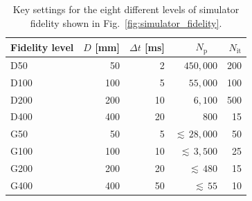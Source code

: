\documentclass[10pt]{article}
\begin{document}
\begin{table}[ht] 
  \caption{Key settings for the eight different levels of simulator fidelity shown in Fig.~\ref{fig:simulator_fidelity}.}
  \centering
  \begin{tabular}{|l|r|r|r|r|}%
  \hline
  Fidelity level & $D$ [mm]  &  $\Delta t$ [ms]  & $N_\mathrm{p} \quad$ & $N_\mathrm{it}$\\ 
  \hline
  D50           & 50              &  2              &  $450,000$     &  200 \\
  D100          & 100             &  5              &  $55,000$     &  100 \\
  D200          & 200             &  10             &  $6,100$     &  500 \\
  D400          & 400             &  20             &  $800$     &  15 \\
  \hline
  G50           & 50              &  5              &  ${\scriptstyle\lesssim}\, 28,000$     &  50 \\
  G100          & 100             &  10             &  ${\scriptstyle\lesssim}\, 3,500$     &  25 \\
  G200          & 200             &  20             &  ${\scriptstyle\lesssim}\, 480$     &  15 \\
  G400          & 400             &  50             &  ${\scriptstyle\lesssim}\, 55$     &  10 \\
  \hline
\end{tabular}
\label{table:simulators}
\end{table}   

					  

				 

																																																																																														

				
			  
										
				  
																																											
																															  
				   
										
				  
																																				   
																																										   
				   
										
				  
																																				   
																																											
				   
										
				
																																										   
\end{document}
